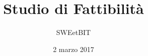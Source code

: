 



\title{\textbf{Studio di Fattibilità}}
\author{SWEetBIT}

\date{2 marzo 2017}




\makeFrontPage

\tableofcontents





